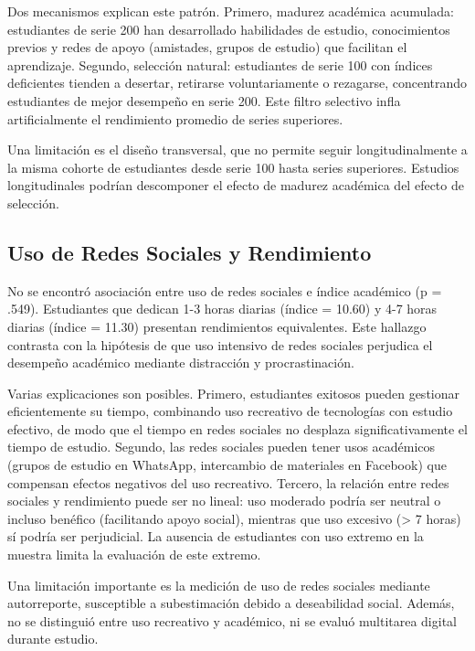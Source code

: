 \documentclass[
  stu,
  floatsintext,
  longtable,
  a4paper,
  nolmodern,
  notxfonts,
  notimes,
  12pt,
  colorlinks=true,linkcolor=blue,citecolor=blue,urlcolor=blue]{apa7}
\begin{document}
Dos mecanismos explican este patrón. Primero, madurez académica
acumulada: estudiantes de serie 200 han desarrollado habilidades de
estudio, conocimientos previos y redes de apoyo (amistades, grupos de
estudio) que facilitan el aprendizaje. Segundo, selección natural:
estudiantes de serie 100 con índices deficientes tienden a desertar,
retirarse voluntariamente o rezagarse, concentrando estudiantes de mejor
desempeño en serie 200. Este filtro selectivo infla artificialmente el
rendimiento promedio de series superiores.

Una limitación es el diseño transversal, que no permite seguir
longitudinalmente a la misma cohorte de estudiantes desde serie 100
hasta series superiores. Estudios longitudinales podrían descomponer el
efecto de madurez académica del efecto de selección.

\subsection{Uso de Redes Sociales y
Rendimiento}\label{uso-de-redes-sociales-y-rendimiento}

No se encontró asociación entre uso de redes sociales e índice académico
(p = .549). Estudiantes que dedican 1-3 horas diarias (índice = 10.60) y
4-7 horas diarias (índice = 11.30) presentan rendimientos equivalentes.
Este hallazgo contrasta con la hipótesis de que uso intensivo de redes
sociales perjudica el desempeño académico mediante distracción y
procrastinación.

Varias explicaciones son posibles. Primero, estudiantes exitosos pueden
gestionar eficientemente su tiempo, combinando uso recreativo de
tecnologías con estudio efectivo, de modo que el tiempo en redes
sociales no desplaza significativamente el tiempo de estudio. Segundo,
las redes sociales pueden tener usos académicos (grupos de estudio en
WhatsApp, intercambio de materiales en Facebook) que compensan efectos
negativos del uso recreativo. Tercero, la relación entre redes sociales
y rendimiento puede ser no lineal: uso moderado podría ser neutral o
incluso benéfico (facilitando apoyo social), mientras que uso excesivo
(\textgreater{} 7 horas) sí podría ser perjudicial. La ausencia de
estudiantes con uso extremo en la muestra limita la evaluación de este
extremo.

Una limitación importante es la medición de uso de redes sociales
mediante autorreporte, susceptible a subestimación debido a deseabilidad
social. Además, no se distinguió entre uso recreativo y académico, ni se
evaluó multitarea digital durante estudio.
\end{document}
